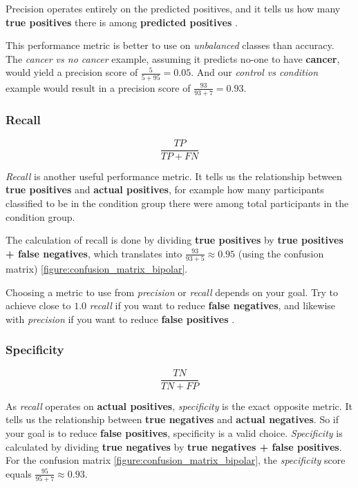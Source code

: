 Precision operates entirely on the predicted positives, and it tells us how many \textbf{true positives} there is among \textbf{predicted positives} \cite{ml_metrics}. 

This performance metric is better to use on \textit{unbalanced} classes than accuracy. The \textit{cancer vs no cancer} example, assuming it predicts no-one to have \textbf{cancer}, would yield a precision score of $ \frac{5}{5+95} = 0.05 $. And our \textit{control vs condition} example would result in a precision score of $ \frac{93}{93+7} = 0.93 $.

\subsubsection{Recall}

\[ \frac{TP}{TP+FN} \]

\textit{Recall} is another useful performance metric. It tells us the relationship between \textbf{true positives} and \textbf{actual positives}, for example how many participants classified to be in the condition group there were among total participants in the condition group.

The calculation of recall is done by dividing \textbf{true positives} by \textbf{true positives + false negatives}, which translates into $ \frac{93}{93+5} \approx 0.95 $ (using the confusion matrix) \ref{figure:confusion_matrix_bipolar}.

Choosing a metric to use from \textit{precision} or \textit{recall} depends on your goal. Try to achieve close to $ 1.0 $ \textit{recall} if you want to reduce \textbf{false negatives}, and likewise with \textit{precision} if you want to reduce \textbf{false positives} \cite{ml_metrics}.

\subsubsection{Specificity}

\[ \frac{TN}{TN+FP} \]

As \textit{recall} operates on \textbf{actual positives}, \textit{specificity} is the exact opposite metric. It tells us the relationship between \textbf{true negatives} and \textbf{actual negatives}. So if your goal is to reduce \textbf{false positives}, specificity is a valid choice. \textit{Specificity} is calculated by dividing \textbf{true negatives} by \textbf{true negatives + false positives}. For the confusion matrix \ref{figure:confusion_matrix_bipolar}, the \textit{specificity} score equals $ \frac{95}{95+7} \approx 0.93 $.

